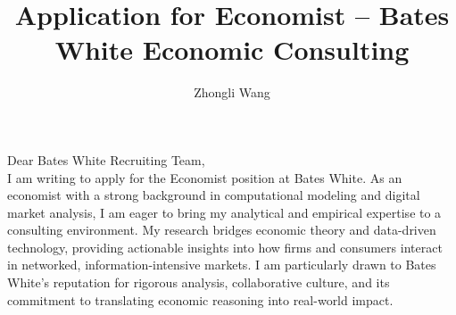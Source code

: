\documentclass{nfr}
\title{Application for Economist – Bates White Economic Consulting}
\author{Zhongli Wang}
\begin{document}

% 
% 
% 
% 


\maketitle


\noindent Dear Bates White Recruiting Team,\\

I am writing to apply for the Economist position at Bates White. As an economist with a strong background in computational modeling and digital market analysis, I am eager to bring my analytical and empirical expertise to a consulting environment. My research bridges economic theory and data-driven technology, providing actionable insights into how firms and consumers interact in networked, information-intensive markets. I am particularly drawn to Bates White’s reputation for rigorous analysis, collaborative culture, and its commitment to translating economic reasoning into real-world impact.\\
\end{document}
